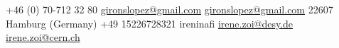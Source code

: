 \ifswedish
  
    {+46 (0) 70-712 32 80}
    {\href{mailto:gironslopez@gmail.com}{gironslopez@gmail.com}}  {\href{mailto:gironslopez@gmail.com}{gironslopez@gmail.com}}
\else
   {22607 Hamburg (Germany)} 
  {+49 15226728321} {ireninafi}
  {\href{mailto:irene.zoi@desy.de}{irene.zoi@desy.de}} {\href{mailto:irene.zoi@cern.ch}{irene.zoi@cern.ch}}
\fi
